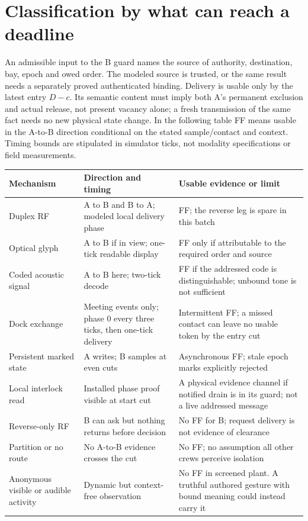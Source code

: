 \documentclass[11pt]{article}
\begin{document}
\section{Classification by what can reach a deadline}
An admissible input to the B guard names the source of authority, destination, bay, epoch and owed order. The modeled source is trusted, or the same result needs a separately proved authenticated binding. Delivery is usable only by the latest entry $D-c$. Its semantic content must imply both A's permanent exclusion and actual release, not present vacancy alone; a fresh transmission of the same fact needs no new physical state change. In the following table FF means usable in the A-to-B direction conditional on the stated sample/contact and context. Timing bounds are stipulated in simulator ticks, not modality specifications or field measurements.

\begin{center}
\begin{tabular}{p{.27\linewidth}p{.29\linewidth}p{.31\linewidth}}
Mechanism & Direction and timing & Usable evidence or limit \\ \hline
Duplex RF & A to B and B to A; modeled local delivery phase & FF; the reverse leg is spare in this batch \\
Optical glyph & A to B if in view; one-tick readable display & FF only if attributable to the required order and source \\
Coded acoustic signal & A to B here; two-tick decode & FF if the addressed code is distinguishable; unbound tone is not sufficient \\
Dock exchange & Meeting events only; phase 0 every three ticks, then one-tick delivery & Intermittent FF; a missed contact can leave no usable token by the entry cut \\
Persistent marked state & A writes; B samples at even cuts & Asynchronous FF; stale epoch marks explicitly rejected \\
Local interlock read & Installed phase proof visible at start cut & A physical evidence channel if notified drain is in its guard; not a live addressed message \\
Reverse-only RF & B can ask but nothing returns before decision & No FF for B; request delivery is not evidence of clearance \\
Partition or no route & No A-to-B evidence crosses the cut & No FF; no assumption all other crews perceive isolation \\
Anonymous visible or audible activity & Dynamic but context-free observation & No FF in screened plant. A truthful authored gesture with bound meaning could instead carry it \\
\end{tabular}
\end{center}
\end{document}
